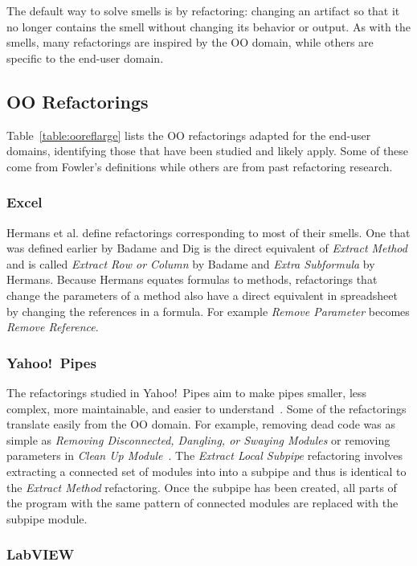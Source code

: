 \documentclass[10pt,conference,compsocconf]{IEEEtran}
\begin{document}
The default way to solve smells is by refactoring: changing an artifact so that it no longer contains the smell without changing its behavior or output.
As with the smells, many refactorings are inspired by the OO domain, while others are specific to the end-user domain. 

\subsection{OO Refactorings}
Table~\ref{table:ooreflarge} lists the OO refactorings adapted for the end-user domains, identifying those that have been studied and likely apply.
Some of these come from Fowler's definitions while others are from past refactoring research. 

\subsubsection{Excel}

Hermans et al. \cite{Hermans2012intraExt} define refactorings corresponding to most of their smells.
One that was defined earlier by Badame and Dig \cite{badame2012refactoring} is the direct equivalent of \emph{Extract Method} and is called \emph{Extract Row or Column} by Badame and \emph{Extra Subformula} by Hermans.
Because Hermans equates formulas to methods, refactorings that change the parameters of a method also have a direct equivalent in spreadsheet by changing the references in a formula. For example \emph{Remove Parameter} becomes \emph{Remove Reference}.
 
\subsubsection{Yahoo!\ Pipes}
The refactorings studied in Yahoo!\ Pipes aim to make pipes smaller, less complex, more maintainable, and easier to understand~\cite{StoleeTSE2013}.
Some of the refactorings translate easily from the OO domain.
For example, removing dead code was as simple as \emph{Removing Disconnected, Dangling, or Swaying Modules} or removing parameters in \emph{Clean Up Module}~\cite{StoleeTSE2013}.
The \emph{Extract Local Subpipe} refactoring involves extracting a connected set of modules into into a subpipe and thus is identical to the \emph{Extract Method} refactoring.
Once the subpipe has been created, all parts of the program with the same pattern of connected modules are replaced with the subpipe module. 

\subsubsection{LabVIEW}
\end{document}
